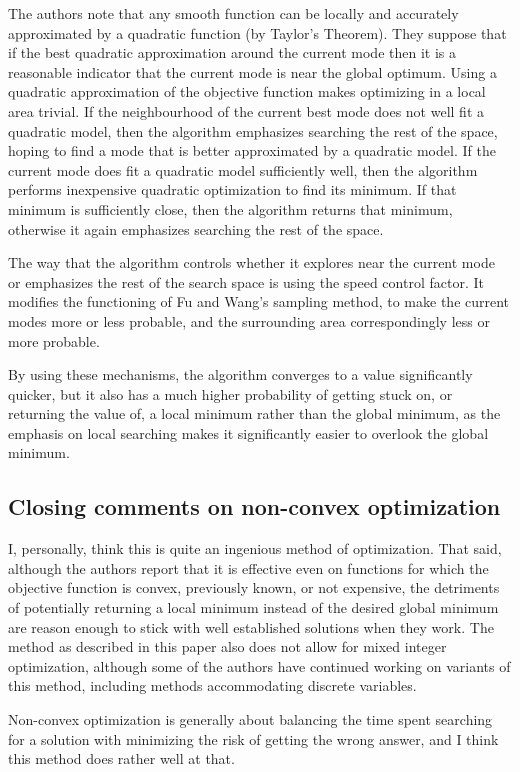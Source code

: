 \documentclass[10pt]{article}
\begin{document}
	The authors note that any smooth function can be locally and accurately approximated by a quadratic function (by Taylor's Theorem). They suppose that if the best quadratic approximation around the current mode then it is a reasonable indicator that the current mode is near the global optimum. Using a quadratic approximation of the objective function makes optimizing in a local area trivial. If the neighbourhood of the current best mode does not well fit a quadratic model, then the algorithm emphasizes searching the rest of the space, hoping to find a mode that is better approximated by a quadratic model. If the current mode does fit a quadratic model sufficiently well, then the algorithm performs inexpensive quadratic optimization to find its minimum. If that minimum is sufficiently close, then the algorithm returns that minimum, otherwise it again emphasizes searching the rest of the space. 
	
	The way that the algorithm controls whether it explores near the current mode or emphasizes the rest of the search space is using the speed control factor. It modifies the functioning of Fu and Wang's sampling method, to make the current modes more or less probable, and the surrounding area correspondingly less or more probable.
	
	By using these mechanisms, the algorithm converges to a value significantly quicker, but it also has a much higher probability of getting stuck on, or returning the value of, a local minimum rather than the global minimum, as the emphasis on local searching makes it significantly easier to overlook the global minimum.
\subsection{Closing comments on non-convex optimization}
	I, personally, think this is quite an ingenious method of optimization. That said, although the authors report that it is effective even on functions for which the objective function is convex, previously known, or not expensive, the detriments of potentially returning a local minimum instead of the desired global minimum are reason enough to stick with well established solutions when they work. The method as described in this paper also does not allow for mixed integer optimization, although some of the authors have continued working on variants of this method, including methods accommodating discrete variables\cite{mps-dv}.
	
	Non-convex optimization is generally about balancing the time spent searching for a solution with minimizing the risk of getting the wrong answer, and I think this method does rather well at that.
\end{document}
